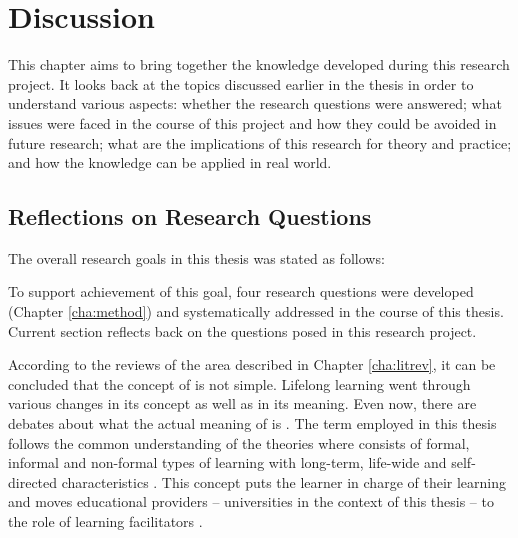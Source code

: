 \chapter{Discussion\label{cha:discussion}}
This chapter aims to bring together the knowledge developed during this research
project. It looks back at the topics discussed earlier in the thesis in order to
understand various aspects: whether the research questions were answered; what
issues were faced in the course of this project and how they could be avoided in
future research; what are the implications of this research for theory and
practice; and how the knowledge can be applied in real world.

\section{Reflections on Research Questions}

The overall research goals in this thesis was stated as follows:


To support achievement of this goal, four research questions were developed
(Chapter \ref{cha:method}) and systematically addressed in the course of this
thesis. Current section reflects back on the questions posed in this research
project.


According to the reviews of the area described in Chapter \ref{cha:litrev}, it
can be concluded that the concept of \LLLs is not simple. Lifelong learning
went through various changes in its concept as well as in its meaning. Even now,
there are debates about what the actual meaning of \LLLs is \citep{Griffin2002}.
The term employed in this thesis follows the common understanding of the
theories where \LLLs consists of formal, informal and non-formal types of
learning with long-term, life-wide and self-directed characteristics
\citep{Longworth2003,Rubenson2002,Schuetze2006}. This concept puts the learner
in charge of their learning and moves educational providers -- universities in
the context of this thesis -- to the role of learning facilitators
\citep{Boshier2000}.

